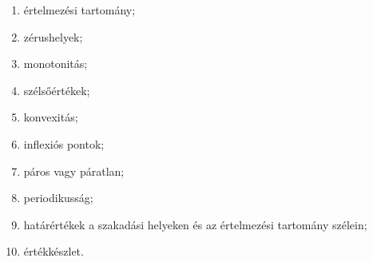 \documentclass[11pt]{article}
\begin{document}
\begin{procbox}
\begin{procedure}\leavevmode
\begin{enumerate}[label=\arabic*.]
\item értelmezési tartomány;
\item zérushelyek;
\item monotonitás;
\item szélsőértékek;
\item konvexitás;
\item inflexiós pontok;
\item páros vagy páratlan;
\item periodikusság;
\item határértékek a szakadási helyeken és az értelmezési tartomány szélein;
\item értékkészlet.
\end{enumerate}
\end{procedure}
\end{procbox}
\end{document}

